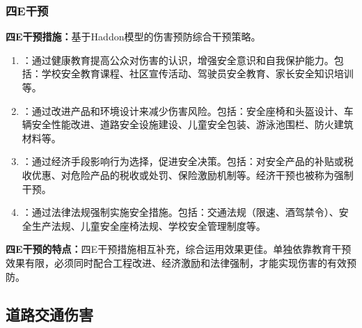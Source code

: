\subsubsection{四E干预}

\begin{keybox}
\textbf{四E干预措施：}基于Haddon模型的伤害预防综合干预策略。

\begin{enumerate}[leftmargin=*]
    \item {}：通过健康教育提高公众对伤害的认识，增强安全意识和自我保护能力。包括：学校安全教育课程、社区宣传活动、驾驶员安全教育、家长安全知识培训等。

    \item {}：通过改进产品和环境设计来减少伤害风险。包括：安全座椅和头盔设计、车辆安全性能改进、道路安全设施建设、儿童安全包装、游泳池围栏、防火建筑材料等。

    \item {}：通过经济手段影响行为选择，促进安全决策。包括：对安全产品的补贴或税收优惠、对危险产品的税收或处罚、保险激励机制等。经济干预也被称为强制干预。

    \item {}：通过法律法规强制实施安全措施。包括：交通法规（限速、酒驾禁令）、安全生产法规、儿童安全座椅法规、学校安全管理制度等。
\end{enumerate}

\textbf{四E干预的特点：}四E干预措施相互补充，综合运用效果更佳。单独依靠教育干预效果有限，必须同时配合工程改进、经济激励和法律强制，才能实现伤害的有效预防。
\end{keybox}

\subsection{道路交通伤害}

